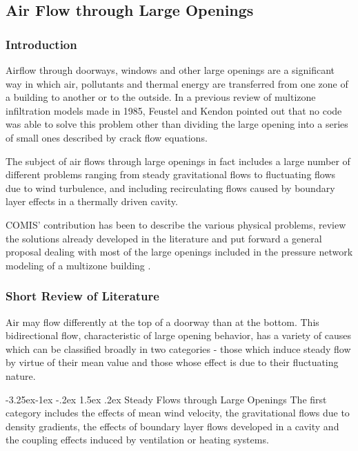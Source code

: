 \documentclass[12pt]{report}
\makeatletter
\renewcommand\paragraph{\@startsection{paragraph}{4}{\z@}%
                                      {-3.25ex\@plus -1ex \@minus -.2ex}%
                                      {1.5ex \@plus .2ex}
                                      {\normalfont\normalsize\bfseries}}
\makeatother
\begin{document}
\subsection{Air Flow through Large Openings}
\subsubsection{Introduction}
Airflow through doorways, windows and other large openings are a significant
way in which air, pollutants and thermal energy are transferred from one zone of
a building to another or to the outside. In a previous review of multizone infiltration models made in 1985, Feustel and Kendon \cite{feustel_kendon_1985} pointed out that no code was
able to solve this problem other than dividing the large opening into a series of
small ones described by crack flow equations.

The subject of air flows through large openings in fact includes a large number of
different problems ranging from steady gravitational flows to fluctuating flows
due to wind turbulence, and including recirculating flows caused by boundary
layer effects in a thermally driven cavity.

COMIS’ contribution has been to describe the various physical problems, review
the solutions already developed in the literature and put forward a general proposal dealing with most of the large openings included in the pressure network
modeling of a multizone building \cite{allard_utsumi_1992}.

\subsubsection{Short Review of Literature}
Air may flow differently at the top of a doorway than at the bottom. This bidirectional flow, characteristic of large opening behavior, has a variety of causes
which can be classified broadly in two categories - those which induce steady
flow by virtue of their mean value and those whose effect is due to their fluctuating nature. 

\paragraph{Steady Flows through Large Openings}
The first category includes the effects of mean wind velocity, the gravitational
flows due to density gradients, the effects of boundary layer flows developed in a
cavity and the coupling effects induced by ventilation or heating systems.
\end{document}
